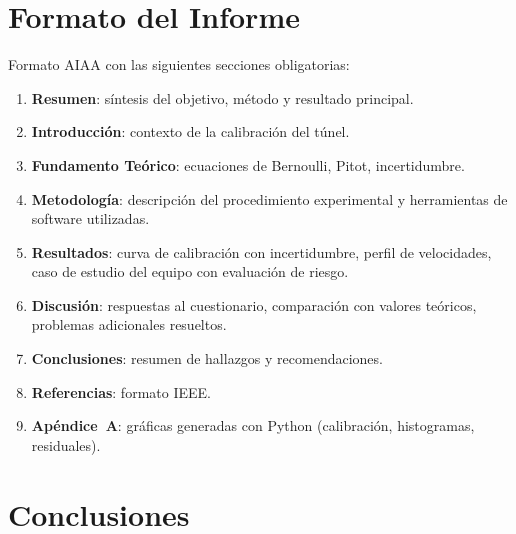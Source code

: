 \documentclass[12pt,a4paper]{article}
\begin{document}
\section{Formato del Informe}
\label{sec:informe}

Formato AIAA con las siguientes secciones obligatorias:

\begin{enumerate}
	\item \textbf{Resumen}: síntesis del objetivo, método y resultado principal.
	\item \textbf{Introducción}: contexto de la calibración del túnel.
	\item \textbf{Fundamento Teórico}: ecuaciones de Bernoulli, Pitot,
	      incertidumbre.
	\item \textbf{Metodología}: descripción del procedimiento experimental
	      y herramientas de software utilizadas.
	\item \textbf{Resultados}: curva de calibración con incertidumbre, perfil
	      de velocidades, caso de estudio del equipo con evaluación de riesgo.
	\item \textbf{Discusión}: respuestas al cuestionario, comparación con
	      valores teóricos, problemas adicionales resueltos.
	\item \textbf{Conclusiones}: resumen de hallazgos y recomendaciones.
	\item \textbf{Referencias}: formato IEEE.
	\item \textbf{Apéndice~A}: gráficas generadas con Python (calibración,
	      histogramas, residuales).
\end{enumerate}

\section{Conclusiones}
\label{sec:conclusiones}
\end{document}
